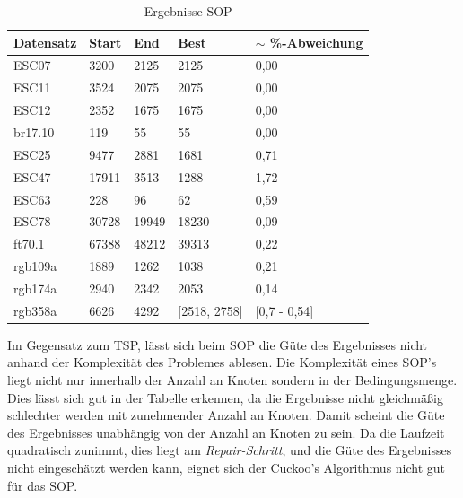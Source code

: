 \documentclass[conference]{IEEEtran}
\begin{document}
      \begin{table}[]
        \label{table:SOP}
        \centering
        \begin{tabular}{|l|ll|l|l|}
        \hline
            Datensatz & \multicolumn{1}{l|}{Start} & End  & Best & $\sim$ \%-Abweichung \\ \hline
            ESC07  & \multicolumn{1}{l|}{3200} & 2125 & 2125  & 0,00       \\ \hline
            ESC11  & \multicolumn{1}{l|}{3524} & 2075 & 2075 & 0,00       \\ \hline
            ESC12  & \multicolumn{1}{l|}{2352} & 1675 & 1675 & 0,00       \\ \hline
            br17.10  & \multicolumn{1}{l|}{119} & 55 & 55 & 0,00       \\ \hline
            ESC25  & \multicolumn{1}{l|}{9477} & 2881 & 1681 & 0,71       \\ \hline   
            ESC47  & \multicolumn{1}{l|}{17911} & 3513 & 1288 &  1,72      \\ \hline
            ESC63  & \multicolumn{1}{l|}{228} & 96 & 62 & 0,59       \\ \hline
            ESC78 & \multicolumn{1}{l|}{30728} & 19949 & 18230 &  0,09     \\ \hline
            ft70.1 & \multicolumn{1}{l|}{67388} & 48212 & 39313 &   0,22     \\ \hline
            rgb109a  & \multicolumn{1}{l|}{1889} & 1262 & 1038 &  0,21      \\ \hline
            rgb174a  & \multicolumn{1}{l|}{2940} & 2342 & 2053 & 0,14       \\ \hline
            rgb358a  & \multicolumn{1}{l|}{6626} & 4292 & [2518, 2758] & [0,7 - 0,54]       \\ \hline
        \end{tabular}
        \caption{Ergebnisse SOP}
      \end{table}

      Im Gegensatz zum TSP, lässt sich beim SOP die Güte des Ergebnisses nicht anhand der Komplexität des Problemes ablesen. 
      Die Komplexität eines SOP's liegt nicht nur innerhalb der Anzahl an Knoten sondern in der Bedingungsmenge. Dies lässt sich gut 
      in der Tabelle erkennen, da die Ergebnisse nicht gleichmäßig schlechter werden mit zunehmender Anzahl an Knoten. 
      Damit scheint die Güte des Ergebnisses unabhängig von der Anzahl an Knoten zu sein. 
      Da die Laufzeit quadratisch zunimmt, dies liegt am \textit{Repair-Schritt}, und die Güte des Ergebnisses nicht 
      eingeschätzt werden kann, eignet sich der Cuckoo's Algorithmus nicht gut für das SOP.
\end{document}
